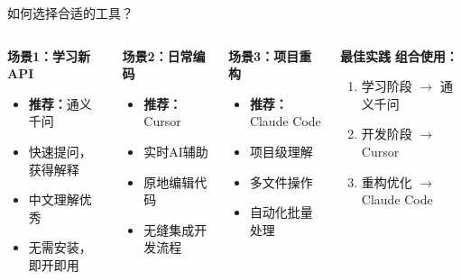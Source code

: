 \begin{frame}{如何选择合适的工具？}
	\begin{columns}
		\begin{block}{\textbf{场景1：学习新API}}
			\begin{itemize}
				\item \textbf{推荐：}通义千问
				\item 快速提问，获得解释
				\item 中文理解优秀
				\item 无需安装，即开即用
			\end{itemize}
		\end{block}

		\vspace{0.3cm}

		\begin{block}{\textbf{场景2：日常编码}}
			\begin{itemize}
				\item \textbf{推荐：}Cursor
				\item 实时AI辅助
				\item 原地编辑代码
				\item 无缝集成开发流程
			\end{itemize}
		\end{block}

		\begin{block}{\textbf{场景3：项目重构}}
			\begin{itemize}
				\item \textbf{推荐：}Claude Code
				\item 项目级理解
				\item 多文件操作
				\item 自动化批量处理
			\end{itemize}
		\end{block}

		\vspace{0.3cm}

		\begin{alertblock}{\textbf{最佳实践}}
			\textbf{组合使用：}
			\begin{enumerate}
				\item 学习阶段 $\rightarrow$ 通义千问
				\item 开发阶段 $\rightarrow$ Cursor
				\item 重构优化 $\rightarrow$ Claude Code
			\end{enumerate}
		\end{alertblock}
	\end{columns}
\end{frame}

